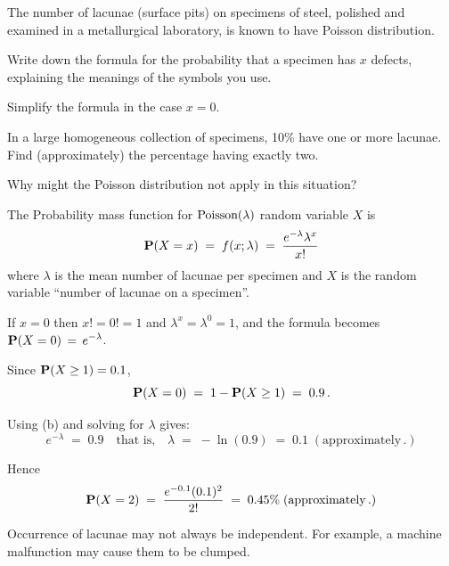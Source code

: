 \begin{ExerciseList}
\Exercise 
The number of lacunae (surface pits) on specimens of steel, polished and examined in a metallurgical laboratory, is known to have Poisson distribution.
\be
\item Write down the formula for the probability that a specimen has $x$
  defects, explaining the meanings of the symbols you use.
\item Simplify the formula in the case $x=0$.
\item In a large homogeneous collection of specimens, 10\% have one or more lacunae. Find (approximately) the percentage having exactly two.
\item Why might the Poisson distribution not apply in this situation?
\ee
\Answer
\be
\item The Probability mass function for $\mbox{{\rm Poisson}}(\lambda)$ random variable $X$ is 
\[\mathbf{P}(X=x)\;=\;f(x;\lambda)\;=\; \frac{e^{-\lambda}\lambda^x}{x!}\]
where $\lambda$ is the mean number of lacunae per specimen and $X$ is
the random variable ``number of lacunae on a specimen''.

\item If $x=0$ then $x!=0!=1$ and $\lambda^x=\lambda^0=1$, and the formula becomes  
$\displaystyle \mathbf{P}(X=0) \,=\, e^{-\lambda}$.

\item Since $\mathbf{P}(X \geq 1) = 0.1$, \[\mathbf{P}( X=0)\;=\; 1 -  \mathbf{P}(X \geq 1)\;=\; 0.9\,.\]

Using (b) and solving for $\lambda$ gives:
\[ e^{-\lambda}\;=\; 0.9 \quad \text{that is,}\quad \lambda \;=\; -\ln(0.9) \;=\; 0.1\;
(\text{approximately}\,.)\]

Hence \[\mathbf{P}( X=2 )\;=\;   \frac{e^{-0.1} (0.1)^2}{2!}  \;=\;0.45\% \;
(\text{approximately}\,.) \]

\item Occurrence of lacunae may not always be independent. For example, a machine malfunction may cause them to be clumped.
\ee


\end{ExerciseList}
